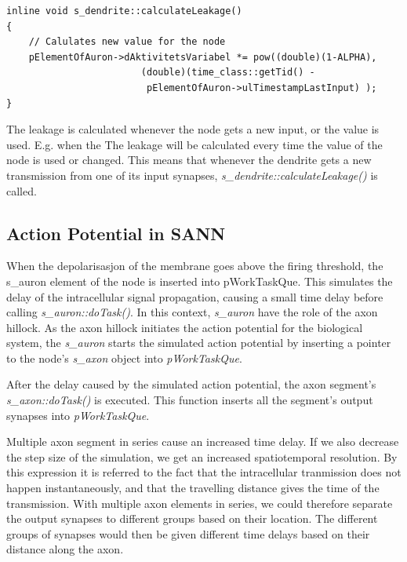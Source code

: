 
\begin{lstlisting}
inline void s_dendrite::calculateLeakage()
{ 
	// Calulates new value for the node
	pElementOfAuron->dAktivitetsVariabel *= pow((double)(1-ALPHA), 
						(double)(time_class::getTid() - 
						 pElementOfAuron->ulTimestampLastInput) );
}
\end{lstlisting}

	The leakage is calculated whenever the node gets a new input, or the value is used.
	E.g. when the 
	The leakage will be calculated every time the value of the node is used or changed.
	This means that whenever the dendrite gets a new transmission from one of its input synapses, \emph{s\_dendrite::calculateLeakage()} is called.








	\subsection{Action Potential in SANN}
	\label{ssecSANNAP}
	When the depolarisasjon of the membrane goes above the firing threshold, the s\_auron element of the node is inserted into pWorkTaskQue.
	This simulates the delay of the intracellular signal propagation, causing a small time delay before calling \emph{s\_auron::doTask()}.
	In this context, \emph{s\_auron} have the role of the axon hillock.
	As the axon hillock initiates the action potential for the biological system, the \emph{s\_auron} starts the simulated action potential by inserting a pointer to the node's \emph{s\_axon} object into \emph{pWorkTaskQue}.

	After the delay caused by the simulated action potential, the axon segment's \emph{s\_axon::doTask()} is executed.
	This function inserts all the segment's output synapses into \emph{pWorkTaskQue}.

	Multiple axon segment in series cause an increased time delay.
	If we also decrease the step size of the simulation, we get an increased spatiotemporal resolution.
	By this expression it is referred to the fact that the intracellular tranmission does not happen instantaneously, and that the travelling distance gives the time of the transmission.
	With multiple axon elements in series, we could therefore separate the output synapses to different groups based on their location.
	The different groups of synapses would then be given different time delays based on their distance along the axon.

